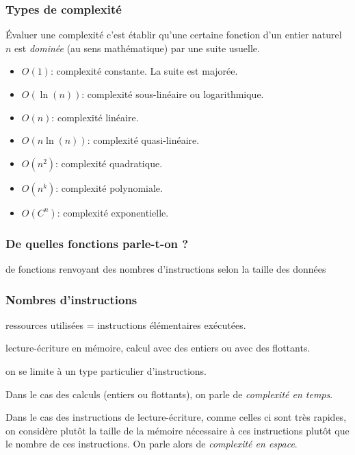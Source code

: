 


\begin{frame}
  \frametitle{Types de complexité}
\'Evaluer une complexité c'est établir qu'une certaine fonction d'un entier naturel $n$ est \emph{dominée} (au sens mathématique) par une suite usuelle.
\begin{itemize}
  \item $O(1)$: complexité constante. La suite est majorée. 
  \item $O(\ln(n))$: complexité sous-linéaire ou logarithmique.
  \item $O(n)$: complexité linéaire.
  \item $O(n\ln(n))$: complexité quasi-linéaire.
  \item $O(n^2)$: complexité quadratique.
  \item $O(n^k)$: complexité polynomiale.
  \item $O(C^n)$: complexité exponentielle.
\end{itemize}
\end{frame}

\begin{frame}
  \frametitle{De quelles fonctions parle-t-on ?}
de fonctions renvoyant des nombres d'instructions selon la taille des données  
\end{frame}

\begin{frame}
  \frametitle{Nombres d'instructions}
ressources utilisées = instructions élémentaires exécutées.

lecture-écriture en mémoire, calcul avec des entiers ou avec des flottants.

on se limite à un type particulier d'instructions.

Dans le cas des calculs (entiers ou flottants), on parle de \emph{complexité en temps}.

Dans le cas des instructions de lecture-écriture, comme celles ci sont très rapides, on considère plutôt la taille de la mémoire nécessaire à ces instructions plutôt que le nombre de ces instructions. On parle alors de \emph{complexité en espace}.
\end{frame}

